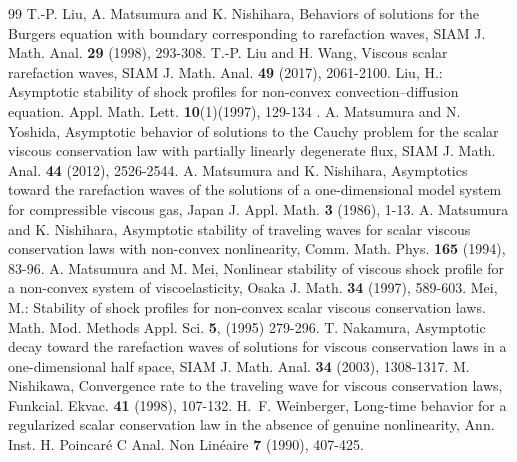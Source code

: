 \documentclass[10pt,reqno]{amsart}
\numberwithin{equation}{section}
\begin{document}
\begin{thebibliography}{99}
		T.-P. Liu, A. Matsumura and K. Nishihara, Behaviors of solutions for the Burgers equation with boundary corresponding to rarefaction waves, SIAM J. Math. Anal. {\bf 29} (1998), 293-308.
		T.-P. Liu and H. Wang, Viscous scalar rarefaction waves, SIAM J. Math. Anal. {\bf 49} (2017), 2061-2100.
		Liu, H.: Asymptotic stability of shock profiles for non-convex convection–diffusion equation. Appl.
		Math. Lett. {\bf10}(1)(1997), 129-134 .
		A. Matsumura and N. Yoshida, Asymptotic behavior of solutions to the Cauchy problem for the scalar viscous conservation law with partially linearly degenerate flux, SIAM J. Math. Anal. {\bf 44} (2012), 2526-2544.
		A. Matsumura and K. Nishihara, Asymptotics toward the rarefaction waves of the solutions of a one-dimensional model system for compressible viscous gas, Japan J. Appl. Math. {\bf 3} (1986), 1-13.
		A. Matsumura and K. Nishihara, Asymptotic stability of traveling waves for scalar viscous conservation laws with non-convex nonlinearity, Comm. Math. Phys. {\bf 165} (1994), 83-96.
		A. Matsumura and M. Mei, Nonlinear stability of viscous shock profile for a non-convex system of viscoelasticity, Osaka J. Math. {\bf 34} (1997), 589-603.
		 Mei, M.: Stability of shock profiles for non-convex scalar viscous conservation laws. Math. Mod. Methods Appl. Sci. {\bf5}, (1995) 279-296.
		T. Nakamura, Asymptotic decay toward the rarefaction waves of solutions for viscous conservation laws in a one-dimensional half space, SIAM J. Math. Anal. {\bf 34} (2003), 1308-1317.
		M. Nishikawa, Convergence rate to the traveling wave for viscous conservation laws, Funkcial. Ekvac. {\bf 41} (1998), 107-132.
		H.~F. Weinberger, Long-time behavior for a regularized scalar conservation law in the absence of genuine nonlinearity, Ann. Inst. H. Poincar\'e{} C Anal. Non Lin\'eaire {\bf 7} (1990), 407-425.
	\end{thebibliography}
\end{document}
